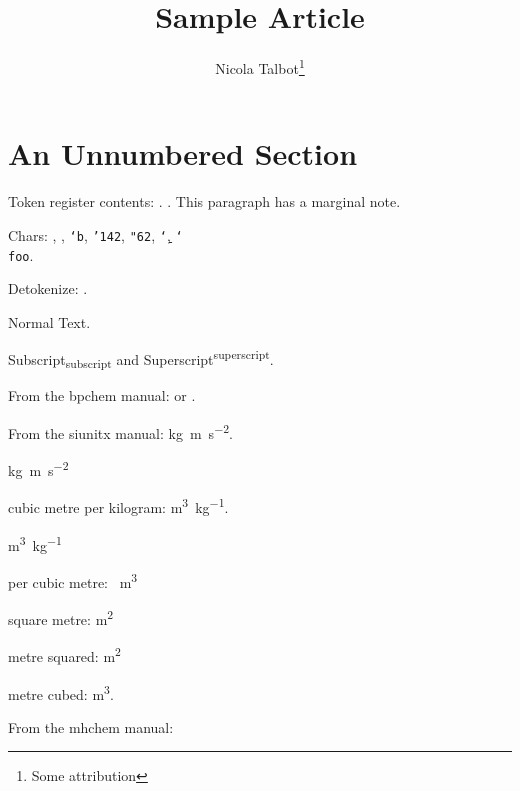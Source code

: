 \documentclass{article}
\title{Sample Article}
\author{Nicola Talbot\thanks{Some attribution}}
\begin{document}
\maketitle

\begin{abstract}
\lipsum[1]
\end{abstract}

\tableofcontents

\section*{An Unnumbered Section}

Token register contents: \the\mytoks.
.
This paragraph has a marginal note.

Chars: , \texttt{}, \texttt{\char`b}, \texttt{\char'142},
\texttt{\char"62}, \texttt{\char`\b}, \texttt{\char`\\ foo}.

Detokenize: \texttt{\detokenize{$\#_^~/}}.

Normal Text.

\lipsum[4-5]

Subscript\textsubscript{subscript} and
Superscript\textsuperscript{superscript}.

From the bpchem manual:
 or .

\bpalpha \bpbeta \bpDelta
\HNMR \CNMR \cis \trans {}

From the siunitx manual:
\si{\kilo\gram\metre\per\square\second}.

\si{kg.m.s^{-2}}

cubic metre per kilogram:
\si{\cubic\metre\per\kilogram}.

\si{m^{3}.kg^{-1}}

per cubic metre: \si{\per\cubic\metre}

square metre: \si{\square\metre}

metre squared: \si{\metre\squared}

metre cubed: \si{\metre\cubed}.

From the mhchem manual:




\end{document}

